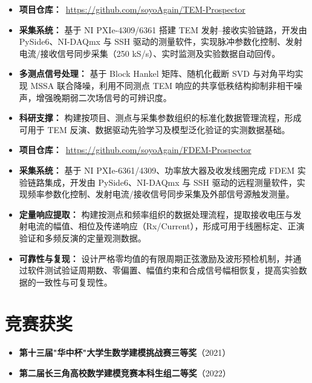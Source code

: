 \documentclass{resume}
\begin{document}
\begin{itemize}[parsep=0.2ex]
  \item \textbf{项目仓库：}\faGithub\ \url{https://github.com/soyoAgain/TEM-Prospector}
  \item \textbf{采集系统：} 基于 NI PXIe-4309/6361 搭建 TEM 发射--接收实验链路，开发由 PySide6、NI-DAQmx 与 SSH 驱动的测量软件，实现脉冲参数化控制、发射电流/接收信号同步采集（250 kS/s）、实时监测及实验数据自动回传。
  \item \textbf{多测点信号处理：} 基于 Block Hankel 矩阵、随机化截断 SVD 与对角平均实现 MSSA 联合降噪，利用不同测点 TEM 响应的共享低秩结构抑制非相干噪声，增强晚期弱二次场信号的可辨识度。
  \item \textbf{科研支撑：} 构建按项目、测点与采集参数组织的标准化数据管理流程，形成可用于 TEM 反演、数据驱动先验学习及模型泛化验证的实测数据基础。
\end{itemize}
\begin{itemize}[parsep=0.2ex]
  \item \textbf{项目仓库：}\faGithub\ \url{https://github.com/soyoAgain/FDEM-Prospector}
  \item \textbf{采集系统：} 基于 NI PXIe-6361/4309、功率放大器及收发线圈完成 FDEM 实验链路集成，开发由 PySide6、NI-DAQmx 与 SSH 驱动的远程测量软件，实现频率参数化控制、发射电流/接收信号同步采集及外部信号源触发测量。
  \item \textbf{定量响应提取：} 构建按测点和频率组织的数据处理流程，提取接收电压与发射电流的幅值、相位及传递响应（Rx/Current），形成可用于线圈标定、正演验证和多频反演的定量观测数据。
  \item \textbf{可靠性与复现：} 设计严格零均值的有限周期正弦激励及波形预检机制，并通过软件测试验证周期数、零偏置、幅值约束和合成信号幅相恢复，提高实验数据的一致性与可复现性。
\end{itemize}
\section{竞赛获奖}
\begin{itemize}[parsep=0.2ex]
  \item \textbf{第十三届"华中杯"大学生数学建模挑战赛三等奖}（2021）
  \item \textbf{第二届长三角高校数学建模竞赛本科生组二等奖}（2022）
\end{itemize}
\end{document}
